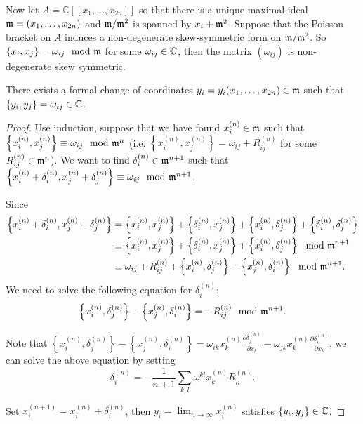 \documentclass[12pt]{amsart}
\numberwithin{equation}{section}
\newcommand{\bra}[1]{\left(#1\right)}
\newcommand{\Bra}[1]{\left\{#1\right\}}
\begin{document}
Now let $A = \mathbb{C}[[x_1, \dots, x_{2n}]]$ so that there is a unique maximal ideal $\mathfrak{m} = (x_1, \dots, x_{2n})$ and $\mathfrak{m}/\mathfrak{m}^2$ is spanned by $x_i + \mathfrak{m}^2$. Suppose that the Poisson bracket on $A$ induces a non-degenerate skew-symmetric form on $\mathfrak{m}/\mathfrak{m}^2$. So $\{x_i, x_j\} = \omega_{ij} \mod {\mathfrak{m}}$ for some $\omega_{ij} \in {\mathbb {C}}$, then the matrix $(\omega_{ij})$ is non-degenerate skew symmetric.

\begin{thm}
   There exists a formal change of coordinates $y_i = y_i(x_1, \dots, x_{2n}) \in \mathfrak{m}$ such that $\{y_i, y_j\} = \omega_{ij} \in {\mathbb {C}}$.
\end{thm}

\begin{proof}
  Use induction, suppose that we have found $x_{i}^{\bra{n}} \in \fm$ such that $\Bra{x_{i}^{\bra{n}}, x_{j}^{\bra{n}}} \equiv \omega_{ij} \mod \fm^n$ (i.e. $\Bra{x_i^{(n)}, x_j^{(n)}} = \omega_{ij} + R_{ij}^{(n)} $ for some $R_{ij}^{(n)} \in \mathfrak{m}^n$). We want to find $\delta_i^{\bra{n}} \in \fm^{n+1}$ such that $\Bra{x_i^{\bra{n}} + \delta_i^{\bra{n}}, x_j^{\bra{n}} + \delta_j^{\bra{n}}} \equiv \omega_{ij} \mod \fm^{n+1}$.
  
  Since 
  \begin{align*}
    \Bra{x_i^{(n)} + \delta_i^{(n)}, x_j^{(n)} + \delta_j^{(n)}} &= \Bra{x_i^{(n)}, x_j^{(n)}} + \Bra{\delta_i^{(n)}, x_j^{(n)}} + \Bra{x_i^{(n)}, \delta_j^{(n)}} + \Bra{\delta_i^{(n)}, \delta_j^{(n)}} \\
    &\equiv \Bra{x_i^{(n)}, x_j^{(n)}} + \Bra{\delta_i^{(n)}, x_j^{(n)}} + \Bra{x_i^{(n)}, \delta_j^{(n)}} \mod \fm^{n+1}\\
    &\equiv \omega_{ij} + R_{ij}^{(n)} + \Bra{x_i^{(n)}, \delta_j^{(n)}} - \Bra{ x_j^{(n)}, \delta_i^{(n)}} \mod \fm^{n+1}.
  \end{align*}
  We need to solve the following equation for $\delta_i^{(n)}$:
  \[\Bra{x_i^{(n)}, \delta_j^{(n)}} - \Bra{ x_j^{(n)}, \delta_i^{(n)}} = -R_{ij}^{(n)} \mod \fm^{n+1}.\]
  
  Note that $\Bra{x_i^{(n)}, \delta_j^{(n)}} - \Bra{ x_j^{(n)}, \delta_i^{(n)}} = \omega_{ik}x_k^{(n)}\frac{\partial \delta_j^{(n)}}{\partial x_k} - \omega_{jk}x_k^{(n)}\frac{\partial \delta_i^{(n)}}{\partial x_k}$, we can solve the above equation by setting 
  $$\delta_i^{(n)} = -\frac{1}{n+1} \sum_{k,l} \omega^{kl} x_k^{(n)} R_{li}^{(n)}.$$
  
  Set $x_i^{(n+1)} = x_i^{(n)} + \delta_i^{(n)}$, then $y_i = \lim_{n \to \infty} x_i^{(n)}$ satisfies $\{y_i, y_j\} \in {\mathbb {C}}$.
\end{proof}
\end{document}
